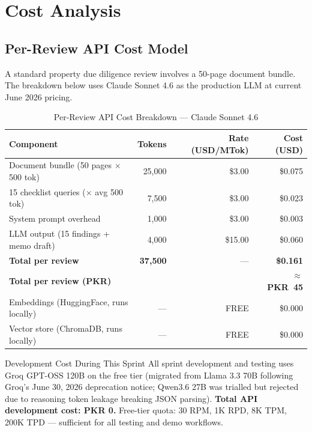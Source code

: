 \documentclass[12pt, a4paper]{article}
\begin{document}
\section{Cost Analysis}

\subsection{Per-Review API Cost Model}

A standard property due diligence review involves a 50-page document bundle.
The breakdown below uses Claude Sonnet 4.6 as the production LLM at current
June 2026 pricing.

\begin{table}[H]
\centering
\caption{Per-Review API Cost Breakdown --- Claude Sonnet 4.6}
\renewcommand{\arraystretch}{1.3}
\begin{tabularx}{\textwidth}{Xrrr}
\toprule
\textbf{Component} & \textbf{Tokens} & \textbf{Rate (USD/MTok)} & \textbf{Cost (USD)} \\
\midrule
Document bundle (50 pages $\times$ 500 tok)   & 25,000 & \$3.00  & \$0.075 \\
15 checklist queries ($\times$ avg 500 tok)   &  7,500 & \$3.00  & \$0.023 \\
System prompt overhead                         &  1,000 & \$3.00  & \$0.003 \\
LLM output (15 findings + memo draft)         &  4,000 & \$15.00 & \$0.060 \\
\midrule
\textbf{Total per review}                     & \textbf{37,500} & --- & \textbf{\$0.161} \\
\textbf{Total per review (PKR)}               &        &     & \textbf{$\approx$ PKR~45} \\
\midrule
Embeddings (HuggingFace, runs locally)        & ---    & FREE    & \$0.000 \\
Vector store (ChromaDB, runs locally)         & ---    & FREE    & \$0.000 \\
\bottomrule
\end{tabularx}
\label{tab:apicost}
\end{table}

\begin{calloutbox}{Development Cost During This Sprint}
All sprint development and testing uses Groq GPT-OSS 120B on the free tier
(migrated from Llama 3.3 70B following Groq's June 30, 2026 deprecation notice;
Qwen3.6 27B was trialled but rejected due to reasoning token leakage breaking
JSON parsing). \textbf{Total API development cost: PKR 0.} Free-tier quota:
30 RPM, 1K RPD, 8K TPM, 200K TPD --- sufficient for all testing and demo
workflows.
\end{calloutbox}
\end{document}
